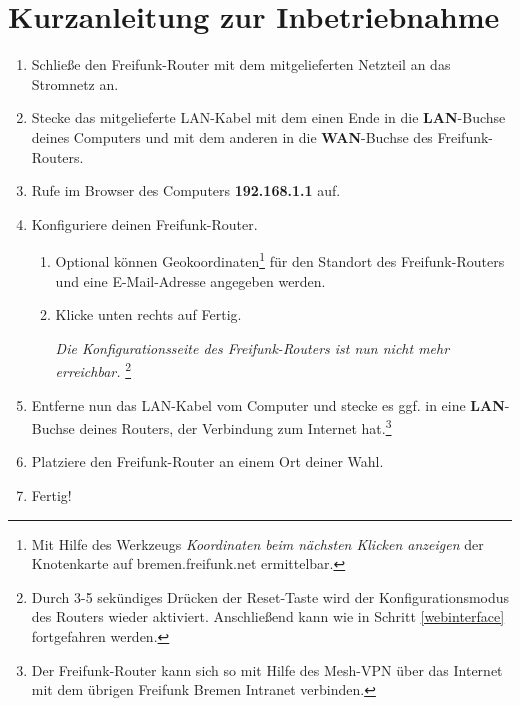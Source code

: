 \documentclass{article}
\begin{document}
\section*{Kurzanleitung zur Inbetriebnahme}

\begin{enumerate}
\item Schließe den Freifunk-Router mit dem mitgelieferten Netzteil an das Stromnetz an.

\item Stecke das mitgelieferte LAN-Kabel mit dem einen Ende in die \textbf{LAN}-Buchse deines Computers und mit dem anderen in die \textbf{WAN}-Buchse des Freifunk-Routers.

\item Rufe im Browser des Computers \textbf{192.168.1.1} auf. \label{webinterface}

\item Konfiguriere deinen Freifunk-Router. 
\begin{enumerate}  
  \item Optional können Geokoordinaten\footnote{Mit Hilfe des Werkzeugs \textit{Koordinaten beim nächsten Klicken anzeigen} der Knotenkarte auf bremen.freifunk.net ermittelbar.} für den Standort des Freifunk-Routers und eine E-Mail-Adresse angegeben werden.

  \item Klicke unten rechts auf \glqq{}Fertig\grqq{}. \label{fertig}

  \textit{Die Konfigurationsseite des Freifunk-Routers ist nun nicht mehr erreichbar.} \footnote{Durch 3-5 sekündiges Drücken der Reset-Taste wird der Konfigurationsmodus des Routers wieder aktiviert. Anschließend kann wie in Schritt \ref{webinterface} fortgefahren werden.}
\end{enumerate}

\item Entferne nun das LAN-Kabel vom Computer und stecke es ggf. in eine \textbf{LAN}-Buchse deines Routers, der Verbindung zum Internet hat.\footnote{Der Freifunk-Router kann sich so mit Hilfe des Mesh-VPN über das Internet mit dem übrigen Freifunk Bremen Intranet verbinden.}

\item Platziere den Freifunk-Router an einem Ort deiner Wahl. \label{platzieren}

\item Fertig!
\end{enumerate}
\end{document}
